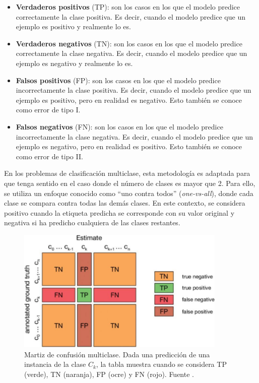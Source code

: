 \begin{itemize}
	\item \textbf{Verdaderos positivos} (TP): son los casos en los que el modelo predice correctamente la clase positiva. Es decir, cuando el modelo predice que un ejemplo es positivo y realmente lo es.
	\item \textbf{Verdaderos negativos} (TN): son los casos en los que el modelo predice correctamente la clase negativa. Es decir, cuando el modelo predice que un ejemplo es negativo y realmente lo es.
	\item \textbf{Falsos positivos} (FP): son los casos en los que el modelo predice incorrectamente la clase positiva. Es decir, cuando el modelo predice que un ejemplo es positivo, pero en realidad es negativo. Esto también se conoce como error de tipo I.
	\item \textbf{Falsos negativos} (FN): son los casos en los que el modelo predice incorrectamente la clase negativa. Es decir, cuando el modelo predice que un ejemplo es negativo, pero en realidad es positivo. Esto también se conoce como error de tipo II.
\end{itemize}

En los problemas de clasificación multiclase, esta metodología es adaptada para que tenga sentido en el caso donde el número de clases es mayor que 2. Para ello, se utiliza un enfoque conocido como \enquote{uno contra todos} (\textit{one-vs-all}), donde cada clase se compara contra todas las demás clases. En este contexto, se considera positivo cuando la etiqueta predicha se corresponde con su valor original y negativa si ha predicho cualquiera de las clases restantes.

\begin{figure}[H]
	\centering
	\includegraphics[width=100mm]{img/confusion-matrix.png}
	\caption{Martiz de confusión multiclase. Dada una predicción de una instancia de la clase $C_k$, la tabla muestra cuando se considera TP (verde), TN (naranja), FP (ocre) y FN (rojo). Fuente \cite{venkataramana2023}.}
	\label{fig:confusion-matrix}
\end{figure}

